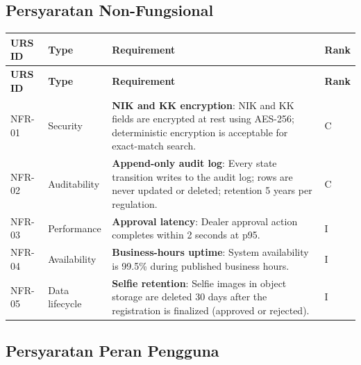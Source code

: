 \documentclass[12pt,a4paper]{article}
\begin{document}
\subsection{Persyaratan Non-Fungsional}

\begin{longtable}{|p{2cm}|p{2.5cm}|p{8cm}|p{1cm}|}
\hline
\textbf{URS ID} & \textbf{Type} & \textbf{Requirement} & \textbf{Rank} \\
\hline
\endfirsthead
\hline
\textbf{URS ID} & \textbf{Type} & \textbf{Requirement} & \textbf{Rank} \\
\hline
\endhead
\hline
\endfoot

NFR-01 & Security & \textbf{NIK and KK encryption}: NIK and KK fields are encrypted at rest using AES-256; deterministic encryption is acceptable for exact-match search. & C \\
\hline

NFR-02 & Auditability & \textbf{Append-only audit log}: Every state transition writes to the audit log; rows are never updated or deleted; retention 5 years per regulation. & C \\
\hline

NFR-03 & Performance & \textbf{Approval latency}: Dealer approval action completes within 2 seconds at p95. & I \\
\hline

NFR-04 & Availability & \textbf{Business-hours uptime}: System availability is 99.5\% during published business hours. & I \\
\hline

NFR-05 & Data lifecycle & \textbf{Selfie retention}: Selfie images in object storage are deleted 30 days after the registration is finalized (approved or rejected). & I \\
\hline

\end{longtable}


\subsection{Persyaratan Peran Pengguna}
\end{document}
